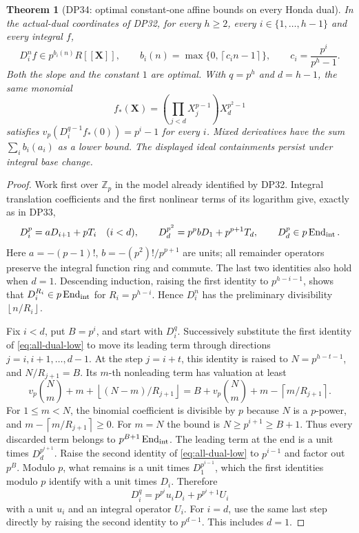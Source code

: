 \documentclass[11pt,a4paper]{article}
\newtheorem{theorem}{Theorem}[section]
\theoremstyle{definition}\newtheorem{remark}[theorem]{Remark}
\newcommand{\Z}{\mathbb Z}\newcommand{\Q}{\mathbb Q}\newcommand{\F}{\mathbb F}
\newcommand{\ceil}[1]{\left\lceil #1\right\rceil}\newcommand{\floor}[1]{\left\lfloor #1\right\rfloor}
\begin{document}
\begin{theorem}[DP34: optimal constant-one affine bounds on every Honda dual]\label{DP34}
In the actual-dual coordinates of DP32, for every $h\ge2$, every $i\in\{1,\ldots,h-1\}$ and every integral $f$,
\[
 D_i^nf\in p^{b_i(n)}R[[\mathbf X]],\qquad
 b_i(n)=\max\{0,\ceil{c_i n-1}\},\qquad c_i=\frac{p^i}{p^h-1}.
\]
Both the slope and the constant $1$ are optimal. With $q=p^h$ and $d=h-1$, the same monomial
\[
 f_*(\mathbf X)=\left(\prod_{j<d}X_j^{p-1}\right)X_d^{p^2-1}
\]
satisfies $v_p(D_i^{q-1}f_*(0))=p^i-1$ for every $i$. Mixed derivatives have the sum $\sum_i b_i(a_i)$ as a lower bound. The displayed ideal containments persist under integral base change.
\end{theorem}
\begin{proof}
Work first over $\Z_p$ in the model already identified by DP32. Integral translation coefficients and the first nonlinear terms of its logarithm give, exactly as in DP33,
\begin{equation}\label{eq:all-dual-low}
 D_i^p=aD_{i+1}+pT_i\quad(i<d),\qquad
 D_d^{p^2}=p^pbD_1+p^{p+1}T_d,\qquad D_d^p\in p\operatorname{End}_{\rm int}.
\end{equation}
Here $a=-(p-1)!$, $b=-(p^2)!/p^{p+1}$ are units; all remainder operators preserve the integral function ring and commute. The last two identities also hold when $d=1$. Descending induction, raising the first identity to $p^{h-i-1}$, shows that $D_i^{R_i}\in p\operatorname{End}_{\rm int}$ for $R_i=p^{h-i}$. Hence $D_i^n$ has the preliminary divisibility $\floor{n/R_i}$.

Fix $i<d$, put $B=p^i$, and start with $D_i^q$. Successively substitute the first identity of \eqref{eq:all-dual-low} to move its leading term through directions $j=i,i+1,\ldots,d-1$. At the step $j=i+t$, this identity is raised to $N=p^{h-t-1}$, and $N/R_{j+1}=B$. Its $m$-th nonleading term has valuation at least
\[
 v_p\binom Nm+m+\floor{(N-m)/R_{j+1}}
 =B+v_p\binom Nm+m-\ceil{m/R_{j+1}}.
\]
For $1\le m<N$, the binomial coefficient is divisible by $p$ because $N$ is a $p$-power, and $m-\ceil{m/R_{j+1}}\ge0$. For $m=N$ the bound is $N\ge p^{i+1}\ge B+1$. Thus every discarded term belongs to $p^{B+1}\operatorname{End}_{\rm int}$. The leading term at the end is a unit times $D_d^{p^{i+1}}$. Raise the second identity of \eqref{eq:all-dual-low} to $p^{i-1}$ and factor out $p^B$. Modulo $p$, what remains is a unit times $D_1^{p^{i-1}}$, which the first identities modulo $p$ identify with a unit times $D_i$. Therefore
\begin{equation}\label{eq:all-dual-q}
 D_i^q=p^{p^i}u_iD_i+p^{p^i+1}U_i
\end{equation}
with a unit $u_i$ and an integral operator $U_i$. For $i=d$, use the same last step directly by raising the second identity to $p^{d-1}$. This includes $d=1$.


\end{proof}
\end{document}
